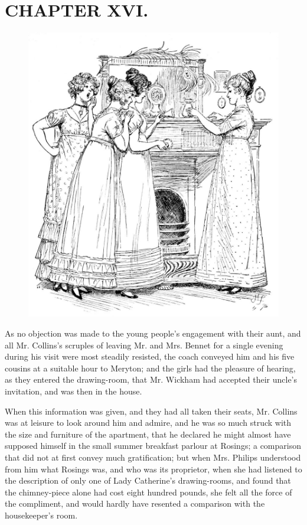 \chapter{CHAPTER XVI.}

\begin{figure}[htbp]
    \centering
    \includegraphics[width=\textwidth]{illustrations/i_124_a.jpg}
\end{figure}


As no objection was made to the young people's engagement with their aunt, and all Mr. Collins's scruples of leaving Mr. and Mrs. Bennet for a single evening during his visit were most steadily resisted, the coach conveyed him and his five cousins at a suitable hour to Meryton; and the girls had the pleasure of hearing, as they entered the drawing-room, that Mr. Wickham had accepted their uncle's invitation, and was then in the house.

When this information was given, and they had all taken their seats, Mr. Collins was at leisure to look around him and admire, and he was so much struck with the size and furniture of the apartment, that he declared he might almost have supposed himself in the small summer breakfast parlour at Rosings; a comparison that did not at first convey much gratification; but when Mrs. Philips understood from him what Rosings was, and who was its proprietor, when she had listened to the description of only one of Lady Catherine's drawing-rooms, and found that the chimney-piece alone had cost eight hundred pounds, she felt all the force of the compliment, and would hardly have resented a comparison with the housekeeper's room.

